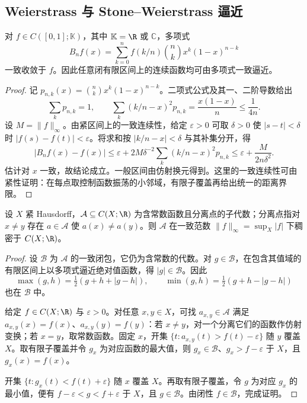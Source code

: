 \subsection{Weierstrass 与 Stone--Weierstrass 逼近}
\begin{theorem}\label{thm:y0-bernstein}
对 $f\in C([0,1];\mathbb K)$，其中 $\mathbb K=\R$ 或 $\mathbb C$，多项式
\[
 B_nf(x)=\sum_{k=0}^nf(k/n)\binom nk x^k(1-x)^{n-k}
\]
一致收敛于 $f$。因此任意闭有限区间上的连续函数均可由多项式一致逼近。
\end{theorem}
\begin{proof}
记 $p_{n,k}(x)=\binom nkx^k(1-x)^{n-k}$。二项式公式及其一、二阶导数给出
\[
 \sum_kp_{n,k}=1,\qquad
 \sum_k(k/n-x)^2p_{n,k}=\frac{x(1-x)}n\le\frac1{4n}.
\]
设 $M=\|f\|_\infty$。由紧区间上的一致连续性，给定 $\varepsilon>0$ 可取 $\delta>0$ 使 $|s-t|<\delta$ 时 $|f(s)-f(t)|<\varepsilon$。将求和按 $|k/n-x|<\delta$ 与其补集分开，得
\[
 |B_nf(x)-f(x)|
 \le\varepsilon+2M\delta^{-2}\sum_k(k/n-x)^2p_{n,k}
 \le\varepsilon+\frac{M}{2n\delta^2}.
\]
估计对 $x$ 一致，故结论成立。一般区间由仿射换元得到。这里的一致连续性可由紧性证明：在每点取控制函数振荡的小邻域，有限子覆盖再给出统一的距离界限。
\end{proof}

\begin{theorem}\label{thm:y0-stone-real}
设 $X$ 紧 Hausdorff，$\mathcal A\subseteq C(X;\R)$ 为含常数函数且分离点的子代数；分离点指对 $x\ne y$ 存在 $a\in\mathcal A$ 使 $a(x)\ne a(y)$。则 $\mathcal A$ 在一致范数 $\|f\|_\infty=\sup_X|f|$ 下稠密于 $C(X;\R)$。
\end{theorem}
\begin{proof}
设 $\mathcal B$ 为 $\mathcal A$ 的一致闭包，它仍为含常数的代数。对 $g\in\mathcal B$，在包含其值域的有限区间上以多项式逼近绝对值函数，得 $|g|\in\mathcal B$。因此
\[
 \max(g,h)=\tfrac12(g+h+|g-h|),\qquad
 \min(g,h)=\tfrac12(g+h-|g-h|)
\]
也在 $\mathcal B$ 中。

给定 $f\in C(X;\R)$ 与 $\varepsilon>0$。对任意 $x,y\in X$，可找 $a_{x,y}\in\mathcal A$ 满足 $a_{x,y}(x)=f(x)$、$a_{x,y}(y)=f(y)$：若 $x\ne y$，对一个分离它们的函数作仿射变换；若 $x=y$，取常数函数。固定 $x$，开集 $\{t:a_{x,y}(t)>f(t)-\varepsilon\}$ 随 $y$ 覆盖 $X$。取有限子覆盖并令 $g_x$ 为对应函数的最大值，则 $g_x\in\mathcal B$、$g_x>f-\varepsilon$ 于 $X$，且 $g_x(x)=f(x)$。

开集 $\{t:g_x(t)<f(t)+\varepsilon\}$ 随 $x$ 覆盖 $X$。再取有限子覆盖，令 $g$ 为对应 $g_x$ 的最小值，便有 $f-\varepsilon<g<f+\varepsilon$ 于 $X$，且 $g\in\mathcal B$。由闭性 $f\in\mathcal B$，完成证明。
\end{proof}


